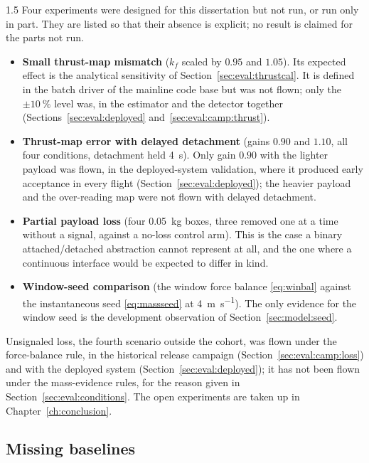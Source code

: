 \begin{spacing}{1.5}
Four experiments were designed for this dissertation but not run, or run only
in part. They are listed so that their absence is explicit; no result is claimed
for the parts not run.
\begin{itemize}
\item \textbf{Small thrust-map mismatch} ($k_f$ scaled by $0.95$ and $1.05$).
Its expected effect is the analytical sensitivity of
Section~\ref{sec:eval:thrustcal}. It is defined in the batch driver of the
mainline code base but was not flown; only the $\pm\SI{10}{\percent}$ level
was, in the estimator and the detector together
(Sections~\ref{sec:eval:deployed} and~\ref{sec:eval:camp:thrust}).
\item \textbf{Thrust-map error with delayed detachment} (gains $0.90$ and
$1.10$, all four conditions, detachment held \SI{4}{\second}). Only gain $0.90$
with the lighter payload was flown, in the deployed-system validation, where it
produced early acceptance in every flight (Section~\ref{sec:eval:deployed}); the
heavier payload and the over-reading map were not flown with delayed detachment.
\item \textbf{Partial payload loss} (four \SI{0.05}{\kg} boxes, three removed
one at a time without a signal, against a no-loss control arm). This is the case
a binary attached/detached abstraction cannot represent at all, and the one where
a continuous interface would be expected to differ in kind.
\item \textbf{Window-seed comparison} (the window force balance
\eqref{eq:winbal} against the instantaneous seed \eqref{eq:massseed} at
\SI{4}{\meter\per\second}). The only evidence for the window seed is the
development observation of Section~\ref{sec:model:seed}.
\end{itemize}
Unsignaled loss, the fourth scenario outside the cohort, was flown under the
force-balance rule, in the historical release campaign
(Section~\ref{sec:eval:camp:loss}) and with the deployed system
(Section~\ref{sec:eval:deployed});
it has not been flown under the mass-evidence rules, for the reason given in
Section~\ref{sec:eval:conditions}. The open experiments are taken up in
Chapter~\ref{ch:conclusion}.

\subsection{Missing baselines}\label{sec:eval:missing}


\end{spacing}
